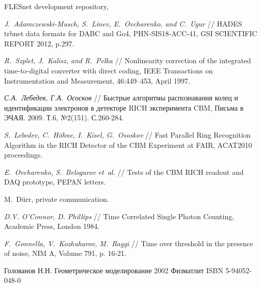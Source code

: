 \begin{thebibliography}{99}


FLESnet development repository,

\textit{J.~Adamczewski-Musch, S.~Linev, E.~Ovcharenko, and C.~Ugur} //
HADES trbnet data formats for DABC and Go4,
PHN-SIS18-ACC-41, GSI SCIENTIFIC REPORT 2012, p.297.

\textit{R.~Szplet, J.~Kalisz, and R.~Pelka} //
Nonlinearity correction of the integrated time-to-digital converter with direct coding,
IEEE Transactions on Instrumentation and Measurement, 46:449–453, April 1997.

\textit{С.А.~Лебедев, Г.А.~Ососков} //
Быстрые алгоритмы распознавания колец и идентификации электронов в детекторе RICH эксперимента CBM,
Письма в ЭЧАЯ. 2009. Т.6, №2(151). С.260-284.

\textit{S.~Lebedev, C.~H\"{o}hne, I.~Kisel, G.~Ososkov} //
Fast Parallel Ring Recognition Algorithm in the RICH Detector of the CBM Experiment at FAIR,
ACAT2010 proceedings.


\textit{E.~Ovcharenko, S.~Belogurov et~al.} //
Tests of the CBM RICH readout and DAQ prototype,
PEPAN letters.

M.~D\"urr, private communication.

\textit{D.V. O’Connor, D. Phillips} //
Time Correlated Single Photon Counting, Academic Press, London 1984.

\textit{F.~Gonnella, V.~Kozhuharov, M.~Raggi} //
Time over threshold in the presence of noise,
NIM A, Volume 791, p. 16-21.


Голованов Н.Н.
Геометрическое моделирование
2002 Физматлит ISBN 5-94052-048-0

\end{thebibliography}

